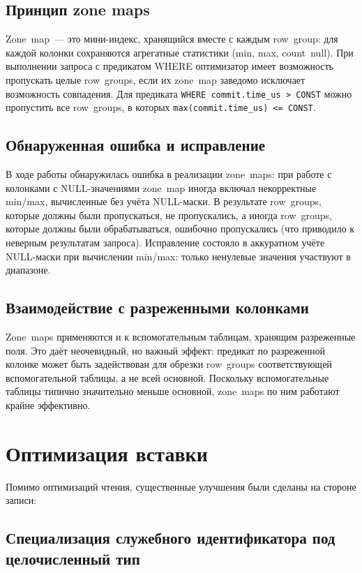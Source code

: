 \subsection{Принцип zone maps}

Zone~map~--- это мини-индекс, хранящийся вместе с каждым
row~group: для каждой колонки сохраняются агрегатные статистики
(min, max, count~null). При выполнении запроса с предикатом WHERE
оптимизатор имеет возможность пропускать целые row~groups, если их
zone~map заведомо исключает возможность совпадения. Для предиката
\texttt{WHERE commit.time\_us > CONST} можно пропустить
все row~groups, в которых
\texttt{max(commit.time\_us) <= CONST}.

\subsection{Обнаруженная ошибка и исправление}

В ходе работы обнаружилась ошибка в реализации zone~maps: при
работе с колонками с NULL-значениями zone~map иногда включал
некорректные min/max, вычисленные без учёта NULL-маски. В
результате row~groups, которые должны были пропускаться, не
пропускались, а иногда row~groups, которые должны были
обрабатываться, ошибочно пропускались (что приводило к неверным
результатам запроса). Исправление состояло в аккуратном учёте
NULL-маски при вычислении min/max: только ненулевые значения
участвуют в диапазоне.

\subsection{Взаимодействие с разреженными колонками}

Zone~maps применяются и к вспомогательным таблицам, хранящим
разреженные поля. Это даёт неочевидный, но важный эффект: предикат
по разреженной колонке может быть задействован для обрезки
row~groups соответствующей вспомогательной таблицы, а не всей
основной. Поскольку вспомогательные таблицы типично значительно
меньше основной, zone~maps по ним работают крайне эффективно.

\section{Оптимизация вставки}

Помимо оптимизаций чтения, существенные улучшения были сделаны на
стороне записи:

\subsection{Специализация служебного идентификатора под целочисленный тип}

